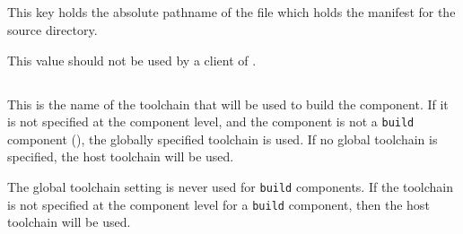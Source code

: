 
\subsection{}\label{variables:source-mtree-manifest}

This key holds the absolute pathname of the file which holds the
\mtree manifest for the source directory.

This value should not be used by a client of \lmsbw.


\subsection{}\label{variables:toolchain}

This is the name of the toolchain that will be used to build the
component.  If it is not specified at the component level, and the
component is not a \texttt{build} component (),
the globally specified toolchain is used.  If no global toolchain is
specified, the host toolchain will be used.

The global toolchain setting is never used for \texttt{build}
components.  If the toolchain is not specified at the component level
for a \texttt{build} component, then the host toolchain will be used.

